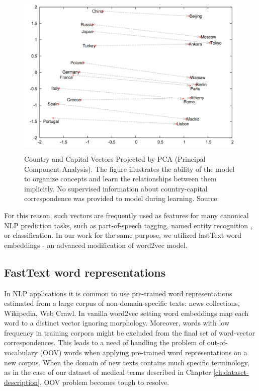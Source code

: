 \begin{figure}[h]
    \centering
    \includegraphics[height=8cm]{Images/word2vec-property.png}
    \caption{Country and Capital Vectors Projected by PCA (Principal Component Analysis). The figure illustrates the ability of the model to organize concepts and learn the relationships between them implicitly. No supervised information about country-capital correspondence was provided to model during learning. Source: \citep{Mikolov-NIPS2013}}
    \label{fig:word2vec-property}
\end{figure} 
%
For this reason, such vectors are frequently used as features for many canonical NLP prediction tasks, such as part-of-speech tagging, named entity recognition \citep{Collobert:DBLP}, or classification. In our work for the same purpose, we utilized fastText word embeddings - an advanced modification of word2vec model.

\subsection{FastText word representations}
\label{sec:fasttext}

In NLP applications it is common to use pre-trained word representations estimated from a large corpus of non-domain-specific texts: news collections, Wikipedia, Web Crawl. In vanilla word2vec setting word embeddings map each word to a distinct vector ignoring morphology. Moreover, words with low frequency in training corpora might be excluded from the final set of word-vector correspondences. This leads to a need of handling the problem of out-of-vocabulary (OOV) words when applying pre-trained word representations on a new corpus. When the domain of new texts contains much specific terminology, as in the case of our dataset of medical terms described in Chapter \ref{ch:dataset-description}, OOV problem becomes tough to resolve.

